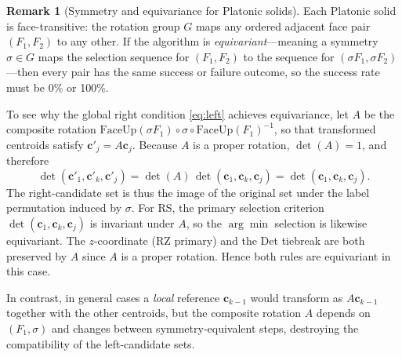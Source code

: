 \documentclass[12pt]{article}
\theoremstyle{definition}
\newtheorem{remark}{Remark}[section]
\begin{document}
\begin{remark}[Symmetry and equivariance for Platonic solids]
\label{rem:symmetry3d}
Each Platonic solid is face-transitive: the rotation group $G$ maps any
ordered adjacent face pair $(F_1, F_2)$ to any other.
If the algorithm is \emph{equivariant}---meaning a symmetry $\sigma\in G$
maps the selection sequence for $(F_1,F_2)$ to the sequence for
$(\sigma F_1, \sigma F_2)$---then every pair has the same success or
failure outcome, so the success rate must be 0\% or 100\%.

To see why the global right condition \eqref{eq:left} achieves equivariance,
let $A$ be the composite rotation $\mathrm{FaceUp}(\sigma F_1)\circ\sigma\circ\mathrm{FaceUp}(F_1)^{-1}$,
so that transformed centroids satisfy $\mathbf{c}'_j = A\mathbf{c}_j$.
Because $A$ is a proper rotation, $\det(A)=1$, and therefore
\[
  \det(\mathbf{c}'_1,\mathbf{c}'_k,\mathbf{c}'_j)
  = \det(A)\,\det(\mathbf{c}_1,\mathbf{c}_k,\mathbf{c}_j)
  = \det(\mathbf{c}_1,\mathbf{c}_k,\mathbf{c}_j).
\]
The right-candidate set is thus the image of the original set under the
label permutation induced by $\sigma$.
For RS, the primary selection criterion $\det(\mathbf{c}_1,\mathbf{c}_k,\mathbf{c}_j)$
is invariant under $A$, so the $\arg\min$ selection is likewise equivariant.
The $z$-coordinate (RZ primary) and the Det tiebreak are both preserved by $A$
since $A$ is a proper rotation.
Hence both rules are equivariant in this case.

In contrast, in general cases a \emph{local} reference $\mathbf{c}_{k-1}$ would transform
as $A\mathbf{c}_{k-1}$ together with the other centroids, but the
composite rotation $A$ depends on $(F_1,\sigma)$ and changes between
symmetry-equivalent steps, destroying the compatibility of the
left-candidate sets.


\end{remark}
\end{document}
